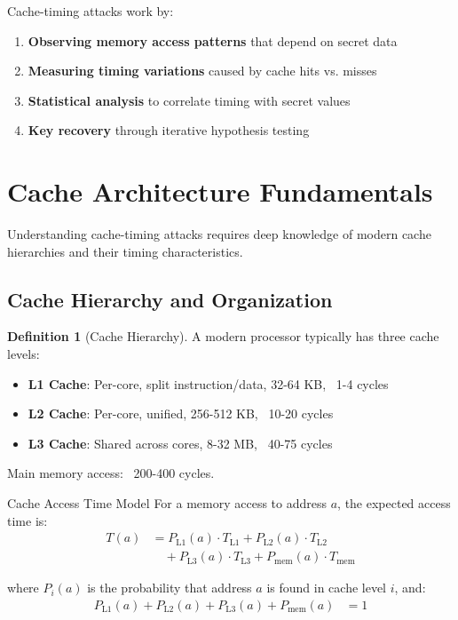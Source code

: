 \documentclass[11pt,a4paper]{article}
\theoremstyle{definition}
\newtheorem{definition}{Definition}[section]
\begin{document}
Cache-timing attacks work by:
\begin{enumerate}[label=\textbf{\arabic*.}]
    \item \textbf{Observing memory access patterns} that depend on secret data
    \item \textbf{Measuring timing variations} caused by cache hits vs. misses
    \item \textbf{Statistical analysis} to correlate timing with secret values
    \item \textbf{Key recovery} through iterative hypothesis testing
\end{enumerate}

\section{Cache Architecture Fundamentals}

Understanding cache-timing attacks requires deep knowledge of modern cache hierarchies and their timing characteristics.

\subsection{Cache Hierarchy and Organization}

\begin{definition}[Cache Hierarchy]
A modern processor typically has three cache levels:
\begin{itemize}
    \item \textbf{L1 Cache}: Per-core, split instruction/data, 32-64 KB, ~1-4 cycles
    \item \textbf{L2 Cache}: Per-core, unified, 256-512 KB, ~10-20 cycles  
    \item \textbf{L3 Cache}: Shared across cores, 8-32 MB, ~40-75 cycles
\end{itemize}
Main memory access: ~200-400 cycles.
\end{definition}

\begin{mathematicsbox}{Cache Access Time Model}
For a memory access to address $a$, the expected access time is:
\begin{align}
T(a) &= P_{\text{L1}}(a) \cdot T_{\text{L1}} + P_{\text{L2}}(a) \cdot T_{\text{L2}} \\
&\quad + P_{\text{L3}}(a) \cdot T_{\text{L3}} + P_{\text{mem}}(a) \cdot T_{\text{mem}}
\end{align}

where $P_i(a)$ is the probability that address $a$ is found in cache level $i$, and:
\begin{align}
P_{\text{L1}}(a) + P_{\text{L2}}(a) + P_{\text{L3}}(a) + P_{\text{mem}}(a) &= 1
\end{align}
\end{mathematicsbox}
\end{document}
